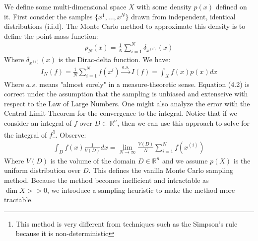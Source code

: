 \documentclass[paper=a4, fontsize=12pt]{scrartcl} %
\numberwithin{equation}{section} %
\numberwithin{figure}{section} %
\numberwithin{table}{section} %
\begin{document}
We define some multi-dimensional space $X$ with some density $p(x)$ defined on it. First consider the samples $\{x^1, \ldots, x^N\}$ drawn from independent, 
identical distributions (i.i.d). The Monte Carlo method to approximate this density is to define the point-mass function:
\begin{align}
    p_N(x)=\frac{1}{N}\sum_{i=1}^{N}\delta_{x^{(i)}}(x)
\end{align}
Where $\delta_{x^{(i)}}(x)$ is the Dirac-delta function. We have:
\begin{align}
    I_N(f)=\frac{1}{N}\sum_{i=1}^{N}f(x^{i}) \xrightarrow{a.s.} I(f) = \int_X f(x)p(x)dx
\end{align}
Where $a.s.$ means "almost surely" in a measure-theoretic sense. Equation (4.2) is correct under the assumption that the sampling is unbiased and extenseive with respect to the Law of Large Numbers.
One might also analyze the error with the Central Limit Theorem for the convergence to the integral.
Notice that if we consider an integral of $f$ over $D \subset \mathbb{R}^n$, then we can use this approach to solve for the 
integral of $f$\footnote{This method is very different from techniques such as the Simpson's rule because it is non-deterministic}. Observe:
\begin{align*}
    \int_D f(x) \frac{1}{V(D)} dx = \lim_{N \rightarrow \infty} \frac{V(D)}{N} \sum_{i=1}^{N} f(x^{(i)})
\end{align*}
Where $V(D)$ is the volume of the domain $D \in \mathbb{R}^n$ and we assume $p(X)$ is the uniform distribution over $D$. This defines the vanilla Monte Carlo sampling method. Because the method becomes 
inefficient and intractable as $\dim X >> 0$, we introduce a sampling heuristic to make the method more tractable.
\end{document}
